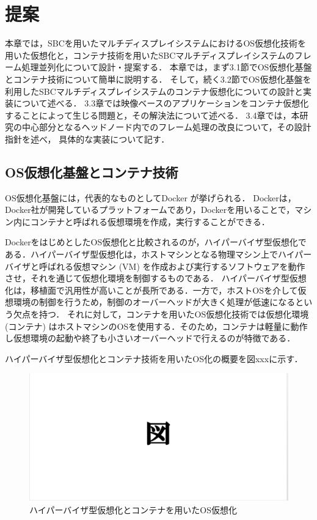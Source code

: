 \chapter{提案}
本章では，SBCを用いたマルチディスプレイシステムにおけるOS仮想化技術を用いた仮想化と，コンテナ技術を用いたSBCマルチディスプレイシステムのフレーム処理並列化について設計・提案する．
本章では，まず3.1節でOS仮想化基盤とコンテナ技術について簡単に説明する．
そして，続く3.2節でOS仮想化基盤を利用したSBCマルチディスプレイシステムのコンテナ仮想化についての設計と実装について述べる．
3.3章では映像ベースのアプリケーションをコンテナ仮想化することによって生じる問題と，その解決法について述べる．
3.4章では，本研究の中心部分となるヘッドノード内でのフレーム処理の改良について，その設計指針を述べ，
具体的な実装について記す．

\section{OS仮想化基盤とコンテナ技術}
OS仮想化基盤には，代表的なものとしてDocker \cite{docker}が挙げられる．
Dockerは，Docker社が開発しているプラットフォームであり，Dockerを用いることで，マシン内にコンテナと呼ばれる仮想環境を作成，実行することができる．

DockerをはじめとしたOS仮想化と比較されるのが，ハイパーバイザ型仮想化である．ハイパーバイザ型仮想化は，ホストマシンとなる物理マシン上でハイパーバイザと呼ばれる仮想マシン (VM) を作成および実行するソフトウェアを動作させ，それを通じて仮想化環境を制御するものである．
ハイパーバイザ型仮想化は，移植面で汎用性が高いことが長所である．一方で，ホストOSを介して仮想環境の制御を行うため，制御のオーバーヘッドが大きく処理が低速になるという欠点を持つ．
それに対して，コンテナを用いたOS仮想化技術では仮想化環境 (コンテナ) はホストマシンのOSを使用する．そのため，コンテナは軽量に動作し仮想環境の起動や終了も小さいオーバーヘッドで行えるのが特徴である．

ハイパーバイザ型仮想化とコンテナ技術を用いたOS化の概要を図xxxに示す．

\begin{figure}[H]
    \hspace*{\fill}
    \includegraphics[width=\linewidth]{./fig/dummy.eps}
    \hspace*{\fill}
    \caption{ハイパーバイザ型仮想化とコンテナを用いたOS仮想化}
\end{figure}

